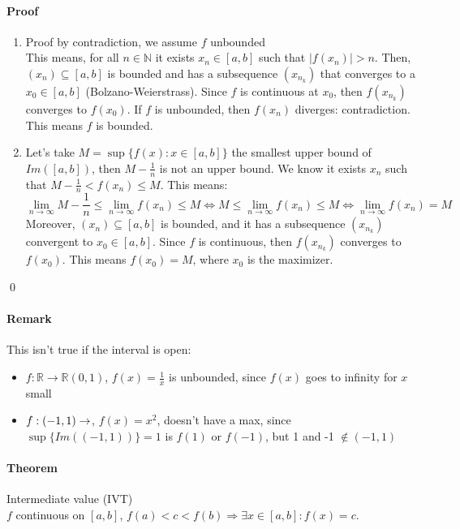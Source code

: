 \documentclass{article}
\newcommand{\abs}[1]{\left|#1\right|}
\newcommand{\func}[3]{#1 : #2 \rightarrow #3}
\newcommand{\funcR}[1]{#1 : \mathbb{R} \rightarrow \mathbb{R}}
\newcommand{\limn}{\lim_{n \to \infty}}
\newcommand{\intcc}[1]{\left[#1\right]}
\newcommand{\intoo}[1]{\left(#1\right)}
\newcommand{\N}{\mathbb{N}}
\newcommand{\Theorem}{\paragraph{Theorem}}
\newcommand{\Remark}{\paragraph{Remark}}
\newcommand{\Proof}{\paragraph{Proof}}
\begin{document}
	\Proof
	\begin{enumerate}[label=(\roman*)]
		\item Proof by contradiction, we assume $f$ unbounded
	\\This means, for all $n \in \N$ it exists $x_n \in \intcc{a,b}$ such that
		$\abs{f(x_n)} > n$. Then, $(x_n) \subseteq \intcc{a,b}$ is bounded and has
		a subsequence $(x_{n_k})$ that converges to a $x_0 \in \intcc{a,b}$
		(Bolzano-Weierstrass). Since $f$ is continuous at $x_0$, then $f(x_{n_k})$
		converges to $f(x_0)$. If $f$ is unbounded, then $f(x_n)$ diverges:
		contradiction. This means $f$ is bounded.

		\item Let's take $M = \sup\{ f(x) : x \in \intcc{a,b} \}$ the smallest upper
		bound of $Im(\intcc{a,b})$, then $M - \frac{1}{n}$ is not an upper bound.
		We know it exists $x_n$ such that $M - \frac{1}{n} < f(x_n) \leq M$. This
		means:
		\begin{equation*}
			\limn{M - \frac{1}{n}} \leq \limn{f(x_n)} \leq M \iff
			M \leq \limn{f(x_n)} \leq M \iff \limn{f(x_n)} = M
		\end{equation*}
		Moreover, $(x_n) \subseteq \intcc{a,b}$ is bounded, and it has a subsequence
		$(x_{n_k})$ convergent to $x_0 \in \intcc{a,b}$. Since $f$ is continuous,
		then $f(x_{n_k})$ converges to $f(x_0)$. This means $f(x_0) = M$, where
		$x_0$ is the maximizer.
	\end{enumerate}
	\qed

	\Remark This isn't true if the interval is open:
	\begin{itemize}
		\item $\funcR{f}{\intoo{0,1}}$, $f(x) = \frac{1}{x}$ is unbounded, since
		$f(x)$ goes to infinity for $x$ small

		\item $\func{f}{\intoo{-1,1}}$, $f(x) = x^2$, doesn't have a max, since
		$\sup\{ Im(\intoo{-1,1}) \} = 1$ is $f(1)$ or $f(-1)$, but 1 and -1 $\notin
		\intoo{-1,1}$
	\end{itemize}

	\Theorem Intermediate value (IVT)
\\$f$ continuous on $\intcc{a,b}$, $f(a) < c < f(b) \Rightarrow \exists x \in
	\intcc{a,b} : f(x) = c$.
\end{document}
